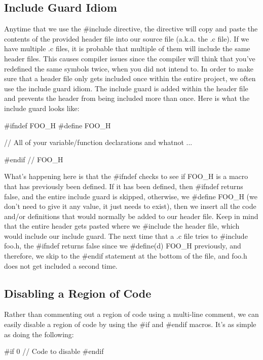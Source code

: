 \documentclass{article}
\begin{document}
\subsection{Include Guard Idiom}

Anytime that we use the \#include directive, the directive will copy and paste the contents of the provided
header file into our source file (a.k.a. the .c file). If we have multiple .c files, it is probable that
multiple of them will include the same header files. This causes compiler issues since the compiler will think
that you've redefined the same symbols twice, when you did not intend to. In order to make sure that a header
file only gets included once within the entire project, we often use the include guard idiom. The include
guard is added within the header file and prevents the header from being included more than once. Here is what
the include guard looks like:

\begin{cblk}
#ifndef FOO_H
#define FOO_H

// All of your variable/function declarations and whatnot
...

#endif // FOO_H
\end{cblk}

What's happening here is that the \#ifndef checks to see if FOO\_H is a macro that has previously been defined.
If it has been defined, then \#ifndef returns false, and the entire include guard is skipped, otherwise, we
\#define FOO\_H (we don't need to give it any value, it just needs to exist), then we insert all the code
and/or definitions that would normally be added to our header file. Keep in mind that the entire header gets
pasted where we \#include the header file, which would include our include guard. The next time that a .c file
tries to \#include foo.h, the \#ifndef returns false since we \#define(d) FOO\_H previously, and therefore, we
skip to the \#endif statement at the bottom of the file, and foo.h does not get included a second time.

\subsection{Disabling a Region of Code}

Rather than commenting out a region of code using a multi-line comment, we can easily disable a region of code
by using the \#if and \#endif macros. It's as simple as doing the following:

\begin{cblk}
#if 0
// Code to disable
#endif
\end{cblk}
\end{document}
